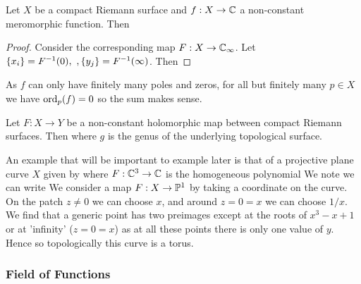 \documentclass{article}
\begin{document}
\begin{prop}
	Let $X$ be a compact Riemann surface and $f:X \to \mathbb{C}$ a non-constant meromorphic function. Then 
\end{prop}
\begin{proof}
	Consider the corresponding map $F: X \to \mathbb{C}_\infty$. Let $\left\{ x_i \right\} = F^{-1}(0), \ ,\left\{ y_j \right\} = F^{-1}(\infty)$. Then 
\end{proof}

\begin{remark}
	As $f$ can only have finitely many poles and zeros, for all but finitely many $p \in X$ we have $\operatorname{ord}_p(f) = 0$ so the sum makes sense. 
\end{remark}

\begin{theorem}
	Let $F:X \to Y$ be a non-constant holomorphic map between compact Riemann surfaces. Then 
where $g$ is the genus of the underlying topological surface. 
\end{theorem}

\begin{example}
	An example that will be important to example later is that of a projective plane curve $X$ given by 
where $F: \mathbb{C}^3 \to \mathbb{C}$ is the homogeneous polynomial 
We note we can write 
We consider a map $F:X \to \mathbb{P}^1$ by taking a coordinate on the curve. On the patch $z \neq 0$ we can choose $x$, and around $z=0=x$ we can choose $1/x$. We find that a generic point has two preimages except at the roots of $x^3-x+1$ or at 'infinity' ($z=0=x$) as at all these points there is only one value of $y$. Hence 
so topologically this curve is a torus.
\end{example}

\subsubsection{Field of Functions}
\end{document}
